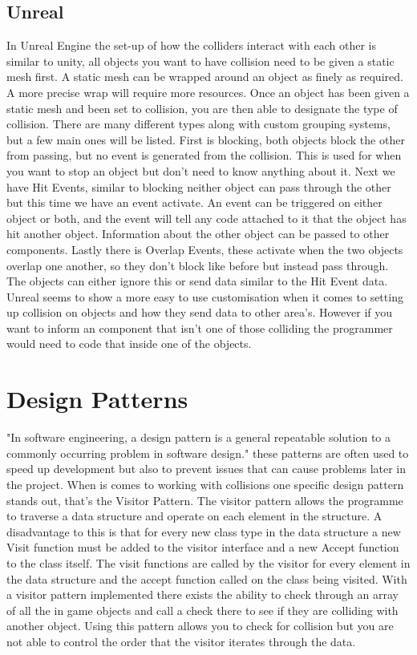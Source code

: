 \documentclass{scrartcl}
\begin{document}
	\subsection{Unreal}
	In Unreal Engine the set-up of how the colliders interact with each other is similar to unity, all objects you want to have collision need to be given a static mesh first. A static mesh can be wrapped around an object as finely as required. A more precise wrap will require more resources\cite{staticmeshes_2018}. Once an object has been given a static mesh and been set to collision, you are then able to designate the type of collision. There are many different types along with custom grouping systems, but a few main ones will be listed\cite{collisionfilteringinunrealengine4_2018}. First is blocking, both objects block the other from passing, but no event is generated from the collision. This is used for when you want to stop an object but don't need to know anything about it. Next we have Hit Events, similar to blocking neither object can pass through the other but this time we have an event activate. An event can be triggered on either object or both, and the event will tell any code attached to it that the object has hit another object. Information about the other object can be passed to other components. Lastly there is Overlap Events, these activate when the two objects overlap one another, so they don't block like before but instead pass through. The objects can either ignore this or send data similar to the Hit Event data\cite{UnrealCollision}. Unreal seems to show a more easy to use customisation when it comes to setting up collision on objects and how they send data to other area's. However if you want to inform an component that isn't one of those colliding the programmer would need to code that inside one of the objects.
	
	\section{Design Patterns}
	"In software engineering, a design pattern is a general repeatable solution to a commonly occurring problem in software design." \cite{designpatternsandrefactoring_2018} these patterns are often used to speed up development but also to prevent issues that can cause problems later in the project. When is comes to working with collisions one specific design pattern stands out, that's the Visitor Pattern\cite{gamma1995design}. The visitor pattern allows the programme to traverse a data structure and operate on each element in the structure. A disadvantage to this is that for every new class type in the data structure a new Visit function must be added to the visitor interface and a new Accept function to the class itself\cite{horsfall2012verifying}. The visit functions are called by the visitor for every element in the data structure and the accept function called on the class being visited. With a visitor pattern implemented there exists the ability to check through an array of all the in game objects and call a check there to see if they are colliding with another object. Using this pattern allows you to check for collision but you are not able to control the order that the visitor iterates through the data\cite{horsfall2012verifying}.
	
\end{document}
